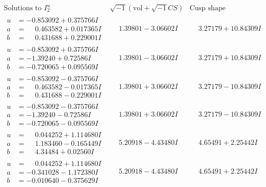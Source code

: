 \documentclass[1p]{elsarticle_modified}
\theoremstyle{definition}
\newcommand{\I}{\sqrt{-1}}
\begin{document}
$$\begin{array}{c|c|c}  
\text{Solutions to }I^u_{2}& \I (\text{vol} + \sqrt{-1}CS) & \text{Cusp shape}\\
 \hline 
\begin{aligned}
u &= -0.853092 + 0.375766 I \\
a &= \phantom{-}0.463582 + 0.017365 I \\
b &= \phantom{-}0.431688 + 0.229001 I\end{aligned}
 & \phantom{-}1.39801 - 3.06602 I & \phantom{-}3.27179 + 10.84309 I \\ \hline\begin{aligned}
u &= -0.853092 + 0.375766 I \\
a &= -1.39240 + 0.72586 I \\
b &= -0.720065 + 0.095569 I\end{aligned}
 & \phantom{-}1.39801 - 3.06602 I & \phantom{-}3.27179 + 10.84309 I \\ \hline\begin{aligned}
u &= -0.853092 - 0.375766 I \\
a &= \phantom{-}0.463582 - 0.017365 I \\
b &= \phantom{-}0.431688 - 0.229001 I\end{aligned}
 & \phantom{-}1.39801 + 3.06602 I & \phantom{-}3.27179 - 10.84309 I \\ \hline\begin{aligned}
u &= -0.853092 - 0.375766 I \\
a &= -1.39240 - 0.72586 I \\
b &= -0.720065 - 0.095569 I\end{aligned}
 & \phantom{-}1.39801 + 3.06602 I & \phantom{-}3.27179 - 10.84309 I \\ \hline\begin{aligned}
u &= \phantom{-}0.044252 + 1.114680 I \\
a &= \phantom{-}1.183460 - 0.165449 I \\
b &= \phantom{-}4.34484 + 0.02560 I\end{aligned}
 & \phantom{-}5.20918 - 4.43480 I & \phantom{-}4.65491 + 2.25442 I \\ \hline\begin{aligned}
u &= \phantom{-}0.044252 + 1.114680 I \\
a &= -0.341028 - 1.172380 I \\
b &= -0.010640 - 0.375629 I\end{aligned}
 & \phantom{-}5.20918 - 4.43480 I & \phantom{-}4.65491 + 2.25442 I \\ \hline\begin{aligned}

\end{aligned}
\end{array}$$
\end{document}
